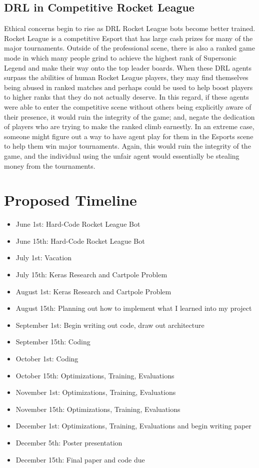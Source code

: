 \documentclass[10pt,twocolumn]{article}
\begin{document}
\subsection{DRL in Competitive Rocket League}
Ethical concerns begin to rise as DRL Rocket League bots become better trained. Rocket League is a competitive Esport that has large cash prizes for many of the major tournaments. Outside of the professional scene, there is also a ranked game mode in which many people grind to achieve the highest rank of Supersonic Legend and make their way onto the top leader boards. When these DRL agents surpass the abilities of human Rocket League players, they may find themselves being abused in ranked matches and perhaps could be used to help boost players to higher ranks that they do not actually deserve. In this regard, if these agents were able to enter the competitive scene without others being explicitly aware of their presence, it would ruin the integrity of the game; and, negate the dedication of players who are trying to make the ranked climb earnestly. In an extreme case, someone might figure out a way to have agent play for them in the Esports scene to help them win major tournaments. Again, this would ruin the integrity of the game, and the individual using the unfair agent would essentially be stealing money from the tournaments.

\section{Proposed Timeline}
\begin{itemize}
    \item June 1st: Hard-Code Rocket League Bot
    \item June 15th: Hard-Code Rocket League Bot
    \item July 1st: Vacation
    \item July 15th: Keras Research and Cartpole Problem
    \item August 1st: Keras Research and Cartpole Problem
    \item August 15th: Planning out how to implement what I learned into my project
    \item September 1st: Begin writing out code, draw out architecture
    \item September 15th: Coding
    \item October 1st: Coding
    \item October 15th: Optimizations, Training, Evaluations
    \item November 1st: Optimizations, Training, Evaluations
    \item November 15th: Optimizations, Training, Evaluations
    \item December 1st: Optimizations, Training, Evaluations and begin writing paper
    \item December 5th: Poster presentation
    \item December 15th: Final paper and code due

    
    
\end{itemize}


\printbibliography 
\end{document}
